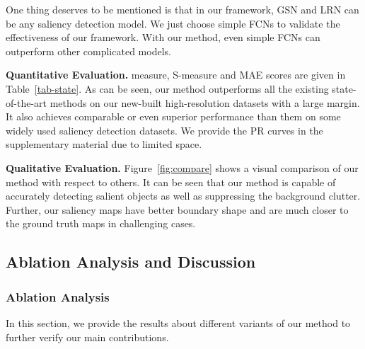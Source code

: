 \documentclass[10pt,twocolumn,letterpaper]{article}
\begin{document}
One thing deserves to be mentioned is that in our framework, GSN and LRN can be any saliency detection model.
We just choose simple FCNs to validate the effectiveness of our framework. With our method, even simple FCNs can outperform other complicated models.

\textbf{Quantitative Evaluation.}
 measure, S-measure and MAE scores are given in Table~\ref{tab-state}. As can be seen, our method outperforms all the existing state-of-the-art methods on our new-built high-resolution datasets with a large margin. It also achieves comparable or even superior performance than them on some widely used saliency detection datasets. We provide the PR curves in the supplementary material due to limited space.

\textbf{Qualitative Evaluation.} Figure~\ref{fig:compare} shows a visual comparison of our method with respect to others. It can be seen that our method is capable of accurately detecting salient objects as well as suppressing the background clutter. Further, our saliency maps have better boundary shape and are much closer to the ground truth maps in challenging cases.
\subsection{ Ablation Analysis and Discussion}
\subsubsection{Ablation Analysis}
In this section, we provide the results about different variants of our method to further verify our main contributions.
\end{document}
